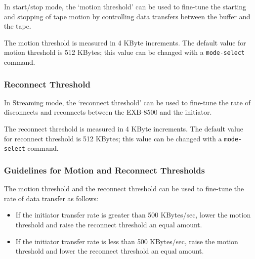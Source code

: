 \documentclass[11pt]{article}
\begin{document}
In start/stop mode, the `motion threshold' can be used to fine-tune the
starting and stopping of tape motion by controlling data transfers between
the buffer and the tape.

The motion threshold is measured in 4 KByte increments. The default value
for motion threshold is 512 KBytes; this value can be changed with a
{\tt mode-select} command.

\subsubsection {Reconnect Threshold}

In Streaming mode, the `reconnect threshold' can be used to fine-tune the
rate of disconnects and reconnects between the EXB-8500 and the initiator.

The reconnect threshold is measured in 4 KByte increments. The default
value for reconnect threshold is 512 KBytes; this value can be changed with
a {\tt mode-select} command.

\subsubsection {Guidelines for Motion and Reconnect Thresholds}

The motion threshold and the reconnect threshold can be used to fine-tune
the rate of data transfer as follows:

\begin {itemize}

\item If the initiator transfer rate is greater than 500 KBytes/sec, lower
the motion threshold and raise the reconnect threshold an equal amount.

\item If the initiator transfer rate is less than 500 KBytes/sec, raise the
motion threshold and lower the reconnect threshold an equal amount.

\end {itemize}
\end{document}
